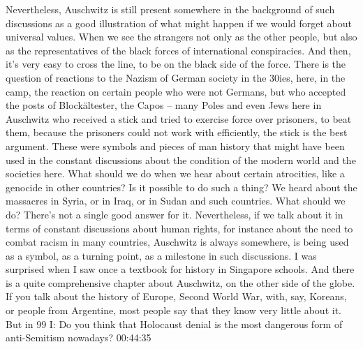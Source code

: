 Nevertheless, Auschwitz is still present somewhere in the background of such discussions as a good illustration of what might happen if we would forget about universal values. When we see the strangers not only as the other people, but also as the representatives of the black forces of international conspiracies. And then, it’s very easy to cross the line, to be on the black side of the force. There is the question of reactions to the Nazism of German society in the 30ies, here, in the camp, the reaction on certain people who were not Germans, but who accepted the posts of Blockältester, the Capos – many Poles and even Jews here in Auschwitz who received a stick and tried to exercise force over prisoners, to beat them, because the prisoners could not work with efficiently, the stick is the best argument. These were symbols and pieces of man history that might have been used in the constant discussions about the condition of the modern world and the societies here. What should we do when we hear about certain atrocities, like a genocide in other countries? Is it possible to do such a thing? We heard about the massacres in Syria, or in Iraq, or in Sudan and such countries. What should we do? There’s not a single good answer for it. Nevertheless, if we talk about it in terms of constant discussions about human rights, for instance about the need to combat racism in many countries, Auschwitz is always somewhere, is being used as a symbol, as a turning point, as a milestone in such discussions. I was surprised when I saw once a textbook for history in Singapore schools. And there is a quite comprehensive chapter about Auschwitz, on the other side of the globe. If you talk about the history of Europe, Second World War, with, say, Koreans, or people from Argentine, most people say that they know very little about it. But in 99%
I: Do you think that Holocaust denial is the most dangerous form of anti-Semitism nowadays? 00:44:35
